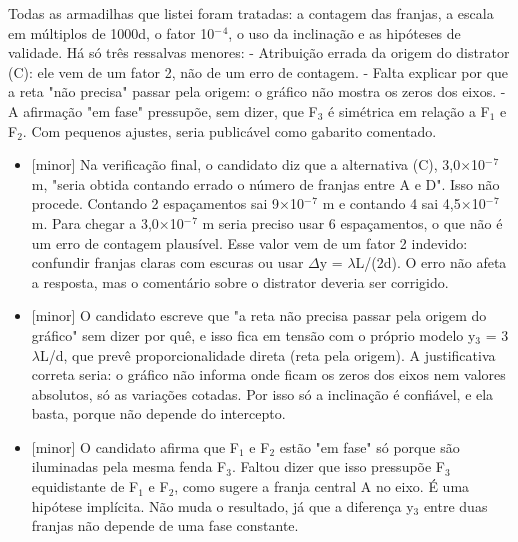 \documentclass{article}%
\begin{document}
Todas as armadilhas que listei foram tratadas: a contagem das franjas, a escala em múltiplos de 1000d, o fator 10$^{-}$$^{4}$, o uso da inclinação e as hipóteses de validade.\newline%
\newline%
Há só três ressalvas menores:\newline%
{-} Atribuição errada da origem do distrator (C): ele vem de um fator 2, não de um erro de contagem.\newline%
{-} Falta explicar por que a reta "não precisa" passar pela origem: o gráfico não mostra os zeros dos eixos.\newline%
{-} A afirmação "em fase" pressupõe, sem dizer, que F$_{3}$ é simétrica em relação a F$_{1}$ e F$_{2}$.\newline%
\newline%
Com pequenos ajustes, seria publicável como gabarito comentado.%
\begin{itemize}%
\item%
{[}minor{]} Na verificação final, o candidato diz que a alternativa (C), 3,0$\times$10$^{-}$$^{7}$ m, "seria obtida contando errado o número de franjas entre A e D". Isso não procede. Contando 2 espaçamentos sai 9$\times$10$^{-}$$^{7}$ m e contando 4 sai 4,5$\times$10$^{-}$$^{7}$ m. Para chegar a 3,0$\times$10$^{-}$$^{7}$ m seria preciso usar 6 espaçamentos, o que não é um erro de contagem plausível. Esse valor vem de um fator 2 indevido: confundir franjas claras com escuras ou usar $\Delta$y = $\lambda$L/(2d). O erro não afeta a resposta, mas o comentário sobre o distrator deveria ser corrigido.%
\item%
{[}minor{]} O candidato escreve que "a reta não precisa passar pela origem do gráfico" sem dizer por quê, e isso fica em tensão com o próprio modelo y$_{3}$ = 3$\lambda$L/d, que prevê proporcionalidade direta (reta pela origem). A justificativa correta seria: o gráfico não informa onde ficam os zeros dos eixos nem valores absolutos, só as variações cotadas. Por isso só a inclinação é confiável, e ela basta, porque não depende do intercepto.%
\item%
{[}minor{]} O candidato afirma que F$_{1}$ e F$_{2}$ estão "em fase" só porque são iluminadas pela mesma fenda F$_{3}$. Faltou dizer que isso pressupõe F$_{3}$ equidistante de F$_{1}$ e F$_{2}$, como sugere a franja central A no eixo. É uma hipótese implícita. Não muda o resultado, já que a diferença y$_{3}$ entre duas franjas não depende de uma fase constante.%
\end{itemize}%
\end{document}

